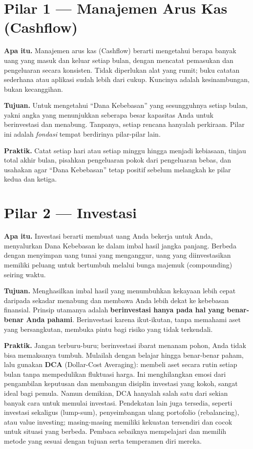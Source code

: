 \documentclass[10pt,a4paper,twocolumn]{article}
\begin{document}
\section{Pilar 1 --- Manajemen Arus Kas (Cashflow)}
\textbf{Apa itu.} Manajemen arus kas (Cashflow) berarti mengetahui berapa banyak uang yang masuk dan keluar setiap bulan, dengan mencatat pemasukan dan pengeluaran secara konsisten. Tidak diperlukan alat yang rumit; buku catatan sederhana atau aplikasi sudah lebih dari cukup. Kuncinya adalah kesinambungan, bukan kecanggihan.

\textbf{Tujuan.} Untuk mengetahui ``Dana Kebebasan'' yang sesungguhnya setiap bulan, yakni angka yang menunjukkan seberapa besar kapasitas Anda untuk berinvestasi dan menabung. Tanpanya, setiap rencana hanyalah perkiraan. Pilar ini adalah \textit{fondasi} tempat berdirinya pilar-pilar lain.

\textbf{Praktik.} Catat setiap hari atau setiap minggu hingga menjadi kebiasaan, tinjau total akhir bulan, pisahkan pengeluaran pokok dari pengeluaran bebas, dan usahakan agar ``Dana Kebebasan'' tetap positif sebelum melangkah ke pilar kedua dan ketiga.

\section{Pilar 2 --- Investasi}
\textbf{Apa itu.} Investasi berarti membuat uang Anda bekerja untuk Anda, menyalurkan Dana Kebebasan ke dalam imbal hasil jangka panjang. Berbeda dengan menyimpan uang tunai yang menganggur, uang yang diinvestasikan memiliki peluang untuk bertumbuh melalui bunga majemuk (compounding) seiring waktu.

\textbf{Tujuan.} Menghasilkan imbal hasil yang menumbuhkan kekayaan lebih cepat daripada sekadar menabung dan membawa Anda lebih dekat ke kebebasan finansial. Prinsip utamanya adalah \textbf{berinvestasi hanya pada hal yang benar-benar Anda pahami}. Berinvestasi karena ikut-ikutan, tanpa memahami aset yang bersangkutan, membuka pintu bagi risiko yang tidak terkendali.

\textbf{Praktik.} Jangan terburu-buru; berinvestasi ibarat menanam pohon, Anda tidak bisa memaksanya tumbuh. Mulailah dengan belajar hingga benar-benar paham, lalu gunakan \textbf{DCA} (Dollar-Cost Averaging): membeli aset secara rutin setiap bulan tanpa mempedulikan fluktuasi harga. Ini menghilangkan emosi dari pengambilan keputusan dan membangun disiplin investasi yang kokoh, sangat ideal bagi pemula. Namun demikian, DCA hanyalah salah satu dari sekian banyak cara untuk memulai investasi. Pendekatan lain juga tersedia, seperti investasi sekaligus (lump-sum), penyeimbangan ulang portofolio (rebalancing), atau value investing; masing-masing memiliki kekuatan tersendiri dan cocok untuk situasi yang berbeda. Pembaca sebaiknya mempelajari dan memilih metode yang sesuai dengan tujuan serta temperamen diri mereka.
\end{document}
